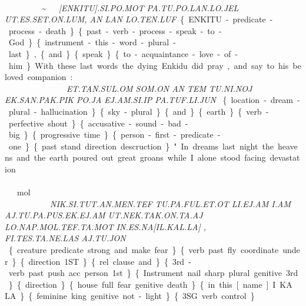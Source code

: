 {

\drie
\drie
 

\cartouche{\en\ki\tu}\si\po\mot~\tu\po\lan\lo\jel~~ \\ \ut\es\set\on\lum\comma \an\lan\~\lo\ten\luf
 
{\it [ENKITU].SI.PO.MOT PA.TU.PO.LAN.LO.JEL \\UT.ES.SET.ON.LUM, AN LAN  LO.TEN.LUF}

\{ENKITU-predicate-process-death\} \{past-verb-process-speak-to-God\} \{instrument-this-word-plural-last\}, \{and\} \{speak\} \{to-acquaintance-love-of-him\} 

With these last words the dying Enkidu did pray, and say to his beloved companion:  

\drie 
 
\et\Atlantan\sul~ \som\on~\an~\tem~\tu\Atlanni\noj~\\ \ek\san\pak\pik~ ~\po\ja~\su~\ej\am\si\ip~\pa\tuf\li\jun 

{\it ET.TAN.SUL.OM SOM.ON AN TEM TU.NI.NOJ \\EK.SAN.PAK.PIK PO.JA EJ.AM.SI.IP PA.TUF.LI.JUN }

\{location-dream-plural-hallucination\} \{sky-plural\} \{and\} \{earth\} \{verb-perfective shout\} \{accusative-sound-bad-big\} \{progressive time\} \{person-first-predicate-one\} \{past stand direction descruction\}

"In dreams last night the heavens and the earth poured out great groans while I alone stood facing devastation.  

\drie 

\nik\si\tut\an\men\tef ~ \tu\pa\ful\et\ot ~ \li\ej\am ~ \Atlani\am\\ ~ \at\tu\pa\pus\ek\ej\am ~ \ut\nek\tak\on\ta\aj\\ ~ \lo\nap\mol\tef\ta\mot \Atlanin\es\na\cartouche{\il\kal\la} ~\\\comma\Atlanfi\tes\ta\Atlanne\las ~ \comma\aj\tu\jon

{\it NIK.SI.TUT.AN.MEN.TEF TU.PA.FUL.ET.OT LI.EJ.AM I.AM\\ AJ.TU.PA.PUS.EK.EJ.AM UT.NEK.TAK.ON.TA.AJ\\ LO.NAP.MOL.TEF.TA.MOT IN.ES.NA[IL.KAL.LA] ,\\FI.TES.TA.NE.LAS AJ.TU.JON }

\{creature predicate strong and make fear\} \{verb past fly coordinate under\} \{direction 1ST\} \{rel.clause and\} \{3rd-verb past push acc. person 1st\}\{Instrument nail sharp plural genitive 3rd\} \{direction\} \{house full fear genitive death\} \{in this [name] I.KA.LA.\} \{feminine king genitive not-light\} \{3SG verb control\} 

}
